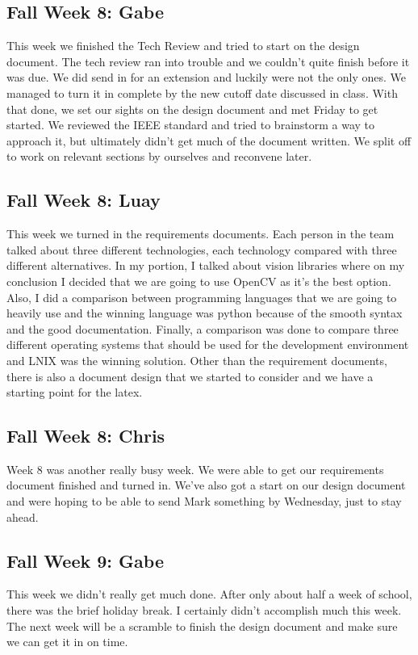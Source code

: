 \documentclass[onecolumn, draftclsnofoot,10pt, compsoc]{IEEEtran}
\begin{document}
\subsection{Fall Week 8: Gabe}
This week we finished the Tech Review and tried to start on the design document. The tech review ran into trouble and we couldn't quite finish before it was due. We did send in for an extension and luckily were not the only ones. We managed to turn it in complete by the new cutoff date discussed in class. With that done, we set our sights on the design document and met Friday to get started. We reviewed the IEEE standard and tried to brainstorm a way to approach it, but ultimately didn't get much of the document written. We split off to work on relevant sections by ourselves and reconvene later.
\subsection{Fall Week 8: Luay}
This week we turned in the requirements documents. Each person in the team talked about three different technologies, each technology compared with three different alternatives. In my portion, I talked about vision libraries where on my conclusion I decided that we are going to use OpenCV as it’s the best option. Also, I did a comparison between programming languages that we are going to heavily use and the winning language was python because of the smooth syntax and the good documentation. Finally, a comparison was done to compare three different operating systems that should be used for the development environment and LNIX was the winning solution. Other than the requirement documents, there is also a document design that we started to consider and we have a starting point for the latex.
\subsection{Fall Week 8: Chris}
Week 8 was another really busy week. We were able to get our requirements document finished and turned in. We've also got a start on our design document and were hoping to be able to send Mark something by Wednesday, just to stay ahead.
\subsection{Fall Week 9: Gabe}
This week we didn't really get much done. After only about half a week of school, there was the brief holiday break. I certainly didn't accomplish much this week. The next week will be a scramble to finish the design document and make sure we can get it in on time.
\end{document}
